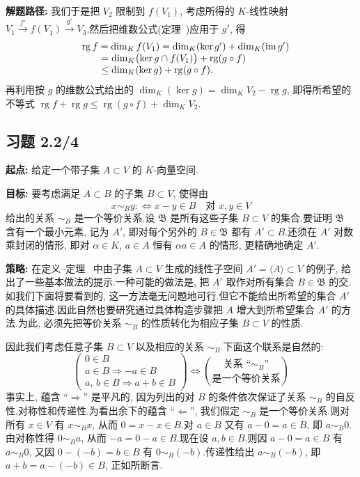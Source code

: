 \noindent\textbf{解题路径:} 我们于是把 $V_2$ 限制到 $f(V_1)$, 考虑所得的 $K$-线性映射 $V_1 \xrightarrow{f'} f(V_1) \xrightarrow{g'} V_3$.然后把维数公式(定理~)应用于 $g'$, 得
\[
\begin{array}{r l}
& \operatorname{rg} f = \dim_K f(V_1) = \dim_K(\ker g') + \dim_K(\operatorname{im} g')\\
& \qquad = \dim_K\bigl(\ker g \cap f(V_1)\bigr) + \operatorname{rg}(g \circ f)\\
& \qquad \leq \dim_K(\ker g) + \operatorname{rg}(g \circ f).
\end{array}
\]
再利用按 $g$ 的维数公式给出的 $\dim_K(\ker g) = \dim_K V_2 - \operatorname{rg} g$, 即得所希望的不等式 $\operatorname{rg} f + \operatorname{rg} g \leq \operatorname{rg}(g \circ f) + \dim_K V_2$.

\subsection*{习题 2.2/4}

\noindent\textbf{起点:} 给定一个带子集 $A \subset V$ 的 $K$-向量空间.

\noindent\textbf{目标:} 要考虑满足 $A \subset B$ 的子集 $B \subset V$, 使得由
\[
x \sim_B y : \Longleftrightarrow x - y \in B \quad \text{对 } x, y \in V
\]
给出的关系 $\sim_B$ 是一个等价关系.设 $\mathfrak{B}$ 是所有这些子集 $B \subset V$ 的集合.要证明 $\mathfrak{B}$ 含有一个最小元素, 记为 $A'$, 即对每个另外的 $B \in \mathfrak{B}$ 都有 $A' \subset B$.还须在 $A'$ 对数乘封闭的情形, 即对 $\alpha \in K$, $a \in A$ 恒有 $\alpha a \in A$ 的情形, 更精确地确定 $A'$.

\noindent\textbf{策略:} 在定义--定理~ 中由子集 $A \subset V$ 生成的线性子空间 $A' = \langle A \rangle \subset V$ 的例子, 给出了一些基本做法的提示.一种可能的做法是, 把 $A'$ 取作对所有集合 $B \in \mathfrak{B}$ 的交.如我们下面将要看到的, 这一方法毫无问题地可行.但它不能给出所希望的集合 $A'$ 的具体描述.因此自然也要研究通过具体构造步骤把 $A$ 增大到所希望集合 $A'$ 的方法.为此, 必须先把等价关系 $\sim_B$ 的性质转化为相应子集 $B \subset V$ 的性质.

因此我们考虑任意子集 $B \subset V$ 以及相应的关系 $\sim_B$.下面这个联系是自然的:
\[
\left( \begin{array}{c}
0 \in B\\
a \in B \Longrightarrow -a \in B\\
a,\, b \in B \Longrightarrow a + b \in B
\end{array} \right)
\Longleftrightarrow
\binom{\text{关系 ``$\sim_B$''}}{\text{是一个等价关系}}
\]
事实上, 蕴含 ``$\Longrightarrow$'' 是平凡的, 因为列出的对 $B$ 的条件依次保证了关系 $\sim_B$ 的自反性,对称性和传递性.为看出余下的蕴含 ``$\Longleftarrow$'', 我们假定 $\sim_B$ 是一个等价关系.则对所有 $x \in V$ 有 $x \sim_B x$, 从而 $0 = x - x \in B$.对 $a \in B$ 又有 $a - 0 = a \in B$, 即 $a \sim_B 0$.由对称性得 $0 \sim_B a$, 从而 $-a = 0 - a \in B$.现在设 $a, b \in B$.则因 $a - 0 = a \in B$ 有 $a \sim_B 0$, 又因 $0 - (-b) = b \in B$ 有 $0 \sim_B (-b)$.传递性给出 $a \sim_B (-b)$, 即 $a + b = a - (-b) \in B$, 正如所断言.

